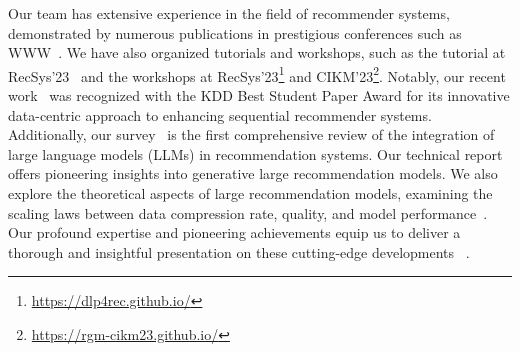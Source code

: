Our team has extensive experience in the field of recommender systems, demonstrated by numerous publications in prestigious conferences such as WWW~\cite{lu2023differentiable, han2024efficient, wan2022cross}. 
We have also organized tutorials and workshops, such as the tutorial at RecSys'23~\cite{liu2023user} and the workshops at RecSys'23\footnote{\url{https://dlp4rec.github.io/}} and CIKM'23\footnote{\url{https://rgm-cikm23.github.io/}}. Notably, our recent work~\cite{yin2024dataset} was recognized with the KDD Best Student Paper Award for its innovative data-centric approach to enhancing sequential recommender systems. Additionally, our survey~\cite{wu2024survey} is the first comprehensive review of the integration of large language models (LLMs) in recommendation systems. Our technical report~\cite{guo2024scaling} offers pioneering insights into generative large recommendation models. We also explore the theoretical aspects of large recommendation models, examining the scaling laws between data compression rate, quality, and model performance~\cite{shen2024predictive}.
Our profound expertise and pioneering achievements equip us to deliver a thorough and insightful presentation on these cutting-edge developments~\cite{zhang2024learning,zhang2020context,zhang2019graph,zhang2022hierarchical,zhang2022cglb,yang2024exploring,li2024configure,yang2023lever,penglive} .

